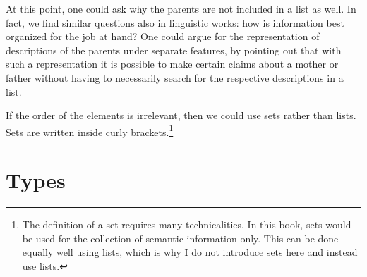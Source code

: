 \begin{figure}[tb]
\ea
{}
\z
\vspace{-\baselineskip}
\end{figure}%
At this point, one could ask why the parents are not included in a list as well. In fact, we find similar questions also
in linguistic works: how is information best organized for the job at hand? One could argue for the
representation of descriptions of the parents under separate features, by pointing out that with
such a representation it is possible to make certain claims about a mother or father without having to necessarily
search for the respective descriptions in a list.

If the order of the elements is irrelevant, then we could use sets rather than lists.
Sets are written inside curly brackets.\footnote{
The definition of a set requires many technicalities. 
In this book, sets would be used for the collection of semantic information only. This can be done equally
well using lists, which is why I do not introduce sets here and instead use lists.%
}

\section{Types}
\label{sec-formalismus-typen}

